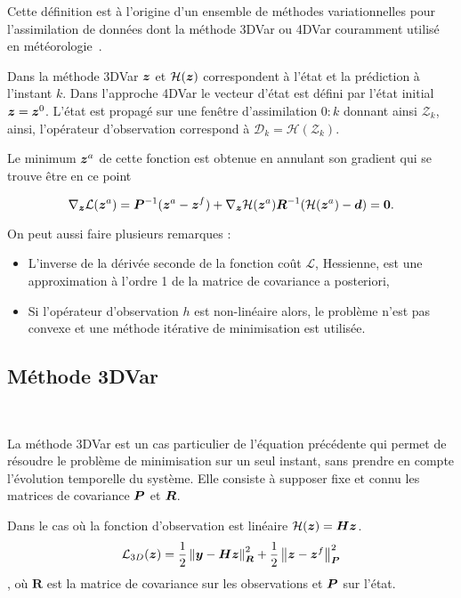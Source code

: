 Cette définition est à l'origine d'un ensemble de méthodes variationnelles pour l'assimilation de données dont la méthode 3DVar ou 4DVar couramment utilisé en météorologie~\cite{talagrand1997assimilation}.

Dans la méthode 3DVar $\bm z$ et $\mathcal H(\bm z)$ correspondent à l'état et la prédiction à l'instant $k$. Dans l'approche 4DVar le vecteur d'état est défini par l'état initial $\bm z = \bm z^0$. L'état est propagé sur une fenêtre d'assimilation $0:k$ donnant ainsi $\mathcal{Z}_k$, ainsi, l'opérateur d'observation correspond à $\mathcal D_k = \mathcal H(\mathcal{Z}_k)$.

Le minimum $\bm z^a$ de cette fonction est obtenue en annulant son gradient qui se trouve être en ce point

\begin{equation*}
    \nabla_{\bm z} \mathcal L(\bm z^a) = \bm{P}^{-1} (\bm z^a - \bm z^f) + \nabla_{\bm z} \mathcal H (\bm z^a) \bm{R}^{-1}(\mathcal H(\bm z^a) - \bm d) = \bm 0.
\end{equation*}

On peut aussi faire plusieurs remarques :

\begin{itemize}
    \item L'inverse de la dérivée seconde de la fonction coût $\mathcal L$, Hessienne, est une approximation à l'ordre 1 de la matrice de covariance a posteriori,
    \item Si l'opérateur d'observation $h$ est non-linéaire alors, le problème n'est pas convexe et une méthode itérative de minimisation est utilisée.
\end{itemize}

\subsection{Méthode 3DVar}~\label{subsec:3dvar}

La méthode 3DVar est un cas particulier de l'équation précédente qui permet de résoudre le problème de minimisation sur un seul instant, sans prendre en compte l'évolution temporelle du système. Elle consiste à supposer fixe et connu les matrices de covariance $\bm{P}$ et $\bm{R}$.

Dans le cas où la fonction d'observation est linéaire $\mathcal H(\bm z) = \bm{H} \bm z$.
\begin{equation*}
    \mathcal L_{3D}(\bm z) = \frac{1}{2}\left\lVert \bm{y}-\bm{H} \bm z \right\rVert^2_{\bm R} + \frac{1}{2}\left\lVert \bm z-\bm z^f \right\rVert_{\bm{P}}^2
\end{equation*}, où $\bm R$ est la matrice de covariance sur les observations et $\bm{P}$ sur l'état.


